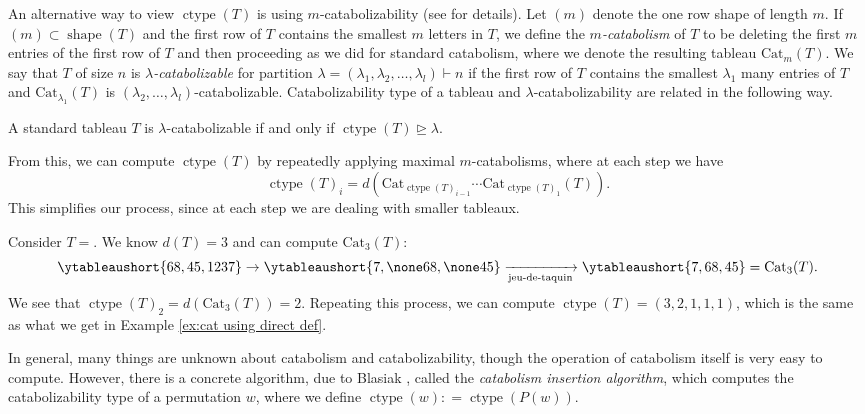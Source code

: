 \documentclass[ALCO, Unicode]{cedram}
\DeclareMathOperator{\ctype}{ctype}
\DeclareMathOperator{\shape}{shape}
\begin{document}
An alternative way to view $\ctype(T)$ is using $m$-catabolizability (see  \cite{SW} for details).
Let $(m)$ denote the one row shape of length $m$. If $(m) \subset \shape (T)$ and the first row of $T$ contains the smallest $m$ letters in $T$, we define the \textit{$m$-catabolism} of $T$ to be deleting the first $m$ entries of the first row of $T$  and then proceeding as we did for standard catabolism, where we denote the resulting tableau $\text{Cat}_m(T)$. We say that $T$ of size $n$ is \textit{$\lambda$-catabolizable} for partition $\lambda = (\lambda_1, \lambda_2,\dots, \lambda_l)\vdash n$ if the first row of $T$ contains the smallest $\lambda_1$ many entries of $T$ and $\text{Cat}_{\lambda_1} (T)$ is $(\lambda_2,\dots, \lambda_l)$-catabolizable. 
Catabolizability type of a tableau and $\lambda$-catabolizability are related in the following way.

\begin{prop}
    A standard tableau $T$ is $\lambda$-catabolizable if and only if $\ctype(T) \unrhd \lambda$.
\end{prop}

From this, we can compute $\ctype(T)$ by repeatedly applying maximal $m$-catabolisms,  where at each step we have \[\ctype(T)_i = d(\text{Cat}_{\ctype(T)_{i-1}}\cdots \text{Cat}_{\ctype(T)_{1}}(T)).\] This simplifies our process, since at each step we are dealing with smaller tableaux.

\begin{ex}
    Consider 
$T = $.
We know $d(T) = 3$ and can compute $\text{Cat}_3(T)$:
\begin{align*}
     \ytableaushort{68,45,1237} \to  \ytableaushort{7,\none  68, \none 45} \xrightarrow[\text{jeu-de-taquin}]{}  \ytableaushort{7,68,45} = \text{Cat}_3(T).
\end{align*}
We see that $\ctype(T)_2 = d(\text{Cat}_3(T)) = 2$. 
Repeating this process, we can compute $\ctype(T) = (3,2,1,1,1)$, which is the same as what we get in Example \ref{ex:cat using direct def}. 
\end{ex}

In general, many things are unknown about catabolism and catabolizability, though the operation of catabolism itself is very easy to compute.
However, there is a concrete algorithm, due to Blasiak \cite{Blasiak}, called the \textit{catabolism insertion algorithm}, which computes the catabolizability type of a permutation $w$, where we define $\ctype(w) : = \ctype(P(w))$.
\end{document}
